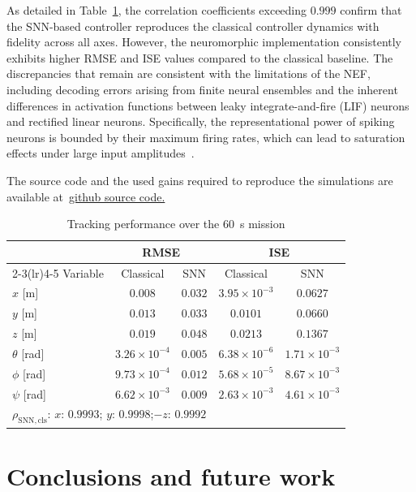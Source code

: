 \documentclass[conference]{IEEEtran}
\begin{document}
As detailed in Table~\ref{tab:benchmark}, the correlation coefficients exceeding $0.999$ confirm that the SNN-based controller reproduces the classical controller dynamics with fidelity across all axes. However, the neuromorphic implementation consistently exhibits higher RMSE and ISE values compared to the classical baseline. The discrepancies that remain are consistent with the limitations of the NEF, including decoding errors arising from finite neural ensembles and the inherent differences in activation functions between leaky integrate-and-fire (LIF) neurons and rectified linear neurons. Specifically, the representational power of spiking neurons is bounded by their maximum firing rates, which can lead to saturation effects under large input amplitudes~\cite{dewolf_neuromorphic_2023}.

The source code and the used gains required to reproduce the simulations are available at~\href{https://github.com/esteedeq/UAV_Nengo.git}{github source code.}

\begin{table}[h!]
\caption{Tracking performance over the $60$~s mission}
\label{tab:benchmark}
\centering
\footnotesize
\setlength{\tabcolsep}{4.5pt}
\begin{tabular}{lcccc}
\toprule
 & \multicolumn{2}{c}{RMSE} & \multicolumn{2}{c}{ISE} \\
\cmidrule(lr){2-3}\cmidrule(lr){4-5}
Variable & Classical & SNN & Classical & SNN \\
\midrule
$x$ [m]        & $0.008$ & $0.032$ & $3.95 \times 10^{-3}$ & $0.0627$ \\
$y$ [m]        & $0.013$ & $0.033$ & $0.0101$ & $0.0660$ \\
$z$ [m]       & $0.019$ & $0.048$ & $0.0213$ & $0.1367$ \\
$\theta$ [rad] & $3 . 26 \times 10^{-4}$ & $0.005$ & $6.38 \times 10^{-6}$ & $1 . 71 \times 10^{-3}$ \\
$\phi$ [rad]   & $9 . 73 \times 10^ {-4}$ & $0.012$ & $5.68 \times 10^{-5}$ & $8 . 67 \times 10^{-3}$ \\
$\psi$ [rad]   & $6 . 62 \times 10 ^{-3}$ & $0.009$ & $2.63 \times 10^{-3}$ & $4 . 61 \times 10^{-3}$ \\
\midrule
\multicolumn{5}{l}{$\rho_{\mathrm{SNN,cls}}$:\; $x$: $0.9993$;\quad
$y$: $0.9998$;\quad $-z$: $0.9992$}\\
\bottomrule
\end{tabular}
\end{table}

\section{Conclusions and future work}\label{Conclusions}
\end{document}
